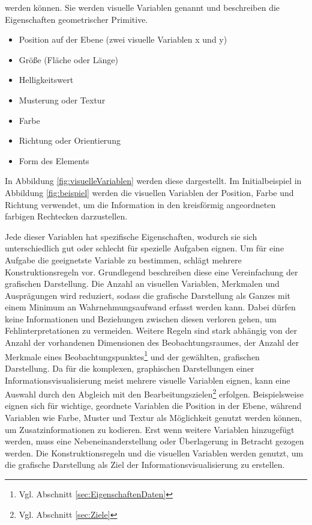 \documentclass[a4paper, 
               12pt,
               DIV=calc,
               version=first,
               pdftex,
               headsepline,
               footsepline,
               bibtotocnumbered,
               liststotocnumbered]{scrreprt}
\begin{document}
werden können. Sie werden visuelle Variablen genannt und beschreiben die Eigenschaften geometrischer Primitive.
\begin{itemize}
\item Position auf der Ebene (zwei visuelle Variablen x und y)
\item Größe (Fläche oder Länge)
\item Helligkeitswert
\item Musterung oder Textur
\item Farbe
\item Richtung oder Orientierung
\item Form des Elements
\end{itemize}
In Abbildung \ref{fig:visuelleVariablen} werden diese dargestellt. Im Initialbeispiel in Abbildung
\ref{fig:beispiel} werden die visuellen Variablen der Position, Farbe und Richtung verwendet,
um die Information in den kreisförmig angeordneten farbigen Rechtecken darzustellen.

Jede dieser Variablen hat spezifische Eigenschaften, wodurch sie sich unterschiedlich gut oder schlecht
für spezielle Aufgaben eignen. Um für eine Aufgabe die geeignetste Variable zu bestimmen, schlägt
\cite{Bertin} mehrere Konstruktionsregeln vor.
Grundlegend beschreiben diese eine Vereinfachung der grafischen Darstellung.
Die Anzahl an visuellen Variablen, Merkmalen und Ausprägungen wird reduziert,
sodass die grafische Darstellung als Ganzes mit einem Minimum an Wahrnehmungsaufwand erfasst werden kann.
Dabei dürfen keine Informationen und Beziehungen zwischen diesen verloren gehen, um Fehlinterpretationen
zu vermeiden. Weitere Regeln sind stark abhängig von der Anzahl
der vorhandenen Dimensionen des Beobachtungsraumes, der Anzahl der Merkmale eines
Beobachtungspunktes\footnote{Vgl. Abschnitt \ref{sec:EigenschaftenDaten}} und der gewählten,
grafischen Darstellung. Da für die komplexen, graphischen Darstellungen einer 
Informationsvisualisierung meist mehrere visuelle Variablen eignen, kann eine Auswahl
durch den Abgleich mit den Bearbeitungszielen\footnote{Vgl. Abschnitt \ref{sec:Ziele}} erfolgen.
Beispielsweise eignen sich für wichtige, geordnete Variablen die Position in der Ebene,
während Variablen wie Farbe, Muster und Textur als Möglichkeit genutzt werden können, um Zusatzinformationen zu kodieren.
Erst wenn weitere Variablen hinzugefügt werden, muss eine Nebeneinanderstellung oder
Überlagerung in Betracht gezogen werden.
Die Konstruktionsregeln und die visuellen Variablen werden genutzt, um
die grafische Darstellung als Ziel der Informationsvisualisierung zu erstellen.
\end{document}
